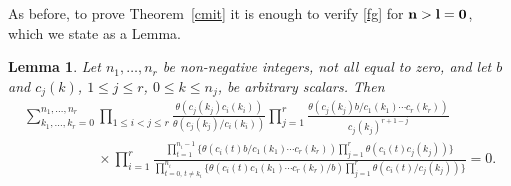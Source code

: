 \documentclass[pdftex]{sigma}%
\numberwithin{equation}{section}
\newtheorem{Lemma}[Theorem]{Lemma}
 { \theoremstyle{definition}
\newtheorem{Definition}[Theorem]{Definition}
\newtheorem{Remark}[Theorem]{Remark} }
\begin{document}
As before, to prove Theorem~\ref{cmit}
it is enough to verify \eqref{fg}
for ${\bf n}>\bf l=\bf 0$, which we state as a Lemma.

\begin{Lemma}\label{cfg}
Let $n_1,\dots,n_r$ be non-negative integers, not all equal to zero,
and let $b$ and
$c_j(k)$, $1\leq j\leq r$, $0\leq k\leq n_j$, be arbitrary scalars.
Then
\begin{gather*}
\sum_{k_1,\dots,k_r=0}^{n_1,\dots,n_r}
\prod\limits_{1\leq i<j\leq r}\frac{\theta(c_j(k_j)c_i(k_i))}{\theta(c_j(k_j)/c_i(k_i))}
\prod\limits_{j=1}^r\frac{\theta(c_j(k_j)b/c_1(k_1)\dotsm c_r(k_r))}{c_j(k_j)^{r+1-j}}
\\ \phantom{\sum_{k_1,\dots,k_r=0}^{n_1,\dots,n_r}}
\times\prod\limits_{i=1}^r\frac{\prod\limits_{t=1}^{n_i-1}
\bigg\{\theta(c_i(t)b/c_1(k_1)\dotsm
 c_r(k_r))\prod\limits_{j=1}^r\theta(c_i(t)c_j(k_j))\bigg\}}
{\prod\limits_{t=0,\,t\neq k_i}^{n_i}
\bigg\{\theta(c_i(t)c_1(k_1)\dotsm c_r(k_r)/b)
\prod\limits_{j=1}^r\theta(c_i(t)/c_j(k_j))\bigg\}}=0.
\end{gather*}
\end{Lemma}
\end{document}
